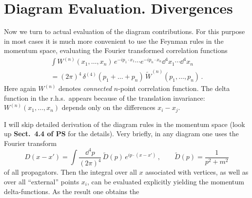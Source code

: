 \section{Diagram Evaluation. Divergences}

Now we turn to actual evaluation of the diagram contributions. For this purpose
in most cases it is much more convenient to use the Feynman rules in the
momentum space, evaluating the Fourier transformed correlation functions
\begin{multline}\label{eq:FTW}
\int W^{(n)}(x_1,\dots,x_n)\,e^{-ip_1\cdot x_1}\cdots e^{-ip_n\cdot x_n}\dd^4x_1\cdots \dd^4x_n\\
=(2\pi)^4\,\delta^{(4)}(p_1+\dots+p_n)\,\tilde W^{(n)}(p_1,\dots,p_n)\,.
\end{multline}
Here again $W^{(n)}$ denotes \emph{connected} $n$-point correlation function.
The delta function in the r.h.s.\ appears because of the translation
invariance: $W^{(n)}(x_1,\dots,x_n)$ depends only on the differences
$x_i-x_j$.

I will skip detailed derivation of the diagram rules in the momentum space
(look up \textbf{Sect.~4.4 of PS} for the details). Very briefly, in any
diagram one uses the Fourier transform
\[
D(x-x')=\int\frac{\dd^4p}{(2\pi)^4}\,\tilde D(p)\,e^{ip\cdot(x-x')}\,,\qquad
\tilde D(p)=\frac1{p^2+m^2}
\]
of all propagators. Then the integral over all $x$ associated with vertices, as
well as over all ``external'' points $x_i$, can be evaluated explicitly yielding
the momentum delta-functions. As the result one obtains the

